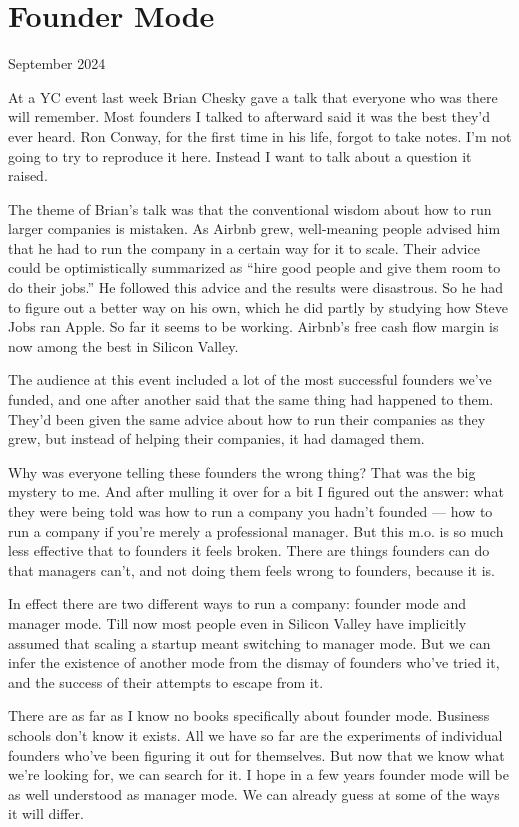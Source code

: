 \chapter{Founder Mode}

September 2024

At a YC event last week Brian Chesky gave a talk that everyone who was
there will remember. Most founders I talked to afterward said it was the
best they'd ever heard. Ron Conway, for the first time in his life,
forgot to take notes. I'm not going to try to reproduce it here. Instead
I want to talk about a question it raised.

The theme of Brian's talk was that the conventional wisdom about how to
run larger companies is mistaken. As Airbnb grew, well-meaning people
advised him that he had to run the company in a certain way for it to
scale. Their advice could be optimistically summarized as ``hire good
people and give them room to do their jobs.'' He followed this advice
and the results were disastrous. So he had to figure out a better way on
his own, which he did partly by studying how Steve Jobs ran Apple. So
far it seems to be working. Airbnb's free cash flow margin is now among
the best in Silicon Valley.

The audience at this event included a lot of the most successful
founders we've funded, and one after another said that the same thing
had happened to them. They'd been given the same advice about how to run
their companies as they grew, but instead of helping their companies, it
had damaged them.

Why was everyone telling these founders the wrong thing? That was the
big mystery to me. And after mulling it over for a bit I figured out the
answer: what they were being told was how to run a company you hadn't
founded --- how to run a company if you're merely a professional
manager. But this m.o. is so much less effective that to founders it
feels broken. There are things founders can do that managers can't, and
not doing them feels wrong to founders, because it is.

In effect there are two different ways to run a company: founder mode
and manager mode. Till now most people even in Silicon Valley have
implicitly assumed that scaling a startup meant switching to manager
mode. But we can infer the existence of another mode from the dismay of
founders who've tried it, and the success of their attempts to escape
from it.

There are as far as I know no books specifically about founder mode.
Business schools don't know it exists. All we have so far are the
experiments of individual founders who've been figuring it out for
themselves. But now that we know what we're looking for, we can search
for it. I hope in a few years founder mode will be as well understood as
manager mode. We can already guess at some of the ways it will differ.

